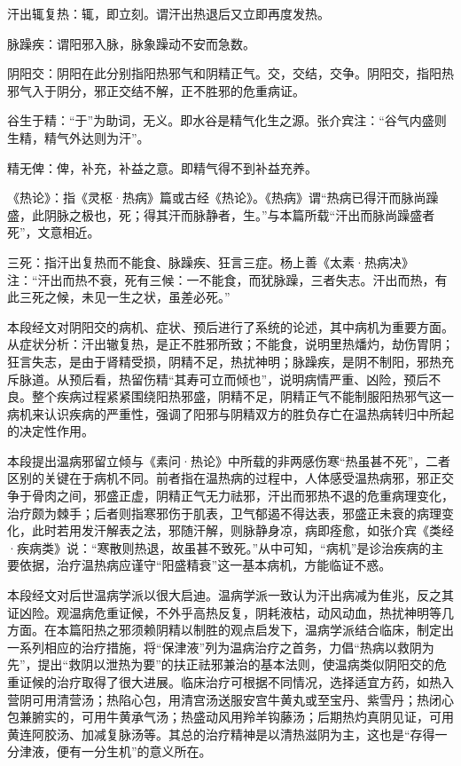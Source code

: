 \documentclass[draft,12pt]{ctexbook}
\begin{document}

\begin{jiaozhu}
	\item 汗出辄复热：辄，即立刻。谓汗出热退后又立即再度发热。
	\item 脉躁疾：谓阳邪入脉，脉象躁动不安而急数。
	\item 阴阳交：阴阳在此分别指阳热邪气和阴精正气。交，交结，交争。阴阳交，指阳热邪气入于阴分，邪正交结不解，正不胜邪的危重病证。
	\item 谷生于精：“于”为助词，无义。即水谷是精气化生之源。张介宾注：“谷气内盛则生精，精气外达则为汗”。
	\item 精无俾：俾，补充，补益之意。即精气得不到补益充养。
	\item 《热论》：指《灵枢·热病》篇或古经《热论》。《热病》谓“热病已得汗而脉尚躁盛，此阴脉之极也，死；得其汗而脉静者，生。”与本篇所载“汗出而脉尚躁盛者死”，文意相近。
	\item 三死：指汗出复热而不能食、脉躁疾、狂言三症。杨上善《太素·热病决》注：“汗出而热不衰，死有三候：一不能食，而犹脉躁，三者失志。汗出而热，有此三死之候，未见一生之状，虽差必死。”
\end{jiaozhu}



本段经文对阴阳交的病机、症状、预后进行了系统的论述，其中病机为重要方面。从症状分析：汗出辙复热，是正不胜邪所致；不能食，说明里热燔灼，劫伤胃阴；狂言失志，是由于肾精受损，阴精不足，热扰神明；脉躁疾，是阴不制阳，邪热充斥脉道。从预后看，热留伤精“其寿可立而倾也”，说明病情严重、凶险，预后不良。整个疾病过程紧紧围绕阳热邪盛，阴精不足，阴精正气不能制服阳热邪气这一病机来认识疾病的严重性，强调了阳邪与阴精双方的胜负存亡在温热病转归中所起的决定性作用。

本段提出温病邪留立倾与《素问·热论》中所载的非两感伤寒“热虽甚不死”，二者区别的关键在于病机不同。前者指在温热病的过程中，人体感受温热病邪，邪正交争于骨肉之间，邪盛正虚，阴精正气无力祛邪，汗出而邪热不退的危重病理变化，治疗颇为棘手；后者则指寒邪伤于肌表，卫气郁遏不得达表，邪盛正未衰的病理变化，此时若用发汗解表之法，邪随汗解，则脉静身凉，病即痊愈，如张介宾《类经·疾病类》说：“寒散则热退，故虽甚不致死。”从中可知，“病机”是诊治疾病的主要依据，治疗温热病应谨守“阳盛精衰”这一基本病机，方能临证不惑。


本段经文对后世温病学派以很大启迪。温病学派一致认为汗出病减为隹兆，反之其证凶险。观温病危重证候，不外乎高热反复，阴耗液枯，动风动血，热扰神明等几方面。在本篇阳热之邪须赖阴精以制胜的观点启发下，温病学派结合临床，制定出一系列相应的治疗措施，将“保津液”列为温病治疗之首务，力倡“热病以救阴为先”，提出“救阴以泄热为要”的扶正祛邪兼治的基本法则，使温病类似阴阳交的危重证候的治疗取得了很大进展。临床治疗可根据不同情况，选择适宜方药，如热入营阴可用清营汤；热陷心包，用清宫汤送服安宫牛黄丸或至宝丹、紫雪丹；热闭心包兼腑实的，可用牛黄承气汤；热盛动风用羚羊钩藤汤；后期热灼真阴见证，可用黄连阿胶汤、加减复脉汤等。其总的治疗精神是以清热滋阴为主，这也是“存得一分津液，便有一分生机”的意义所在。
\end{document}
